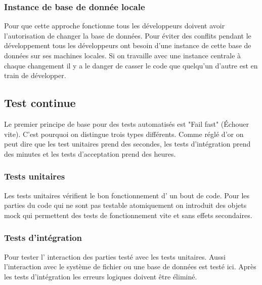 

\subsubsection{Instance de base de donnée locale}

Pour que cette approche fonctionne tous les développeurs doivent avoir l'autorisation de changer la base de données. Pour éviter des conflits pendant le développement tous les développeurs ont besoin d'une instance de cette base de données sur ses machines locales. Si on travaille avec une instance centrale à chaque changement il y a le danger de casser le code que quelqu'un d'autre est en train de développer.
\newpage


\subsection{Test continue}
Le premier principe de base pour des tests automatisés est "Fail fast" (Échouer vite).
C'est pourquoi on distingue trois types différents. Comme réglé d'or on  peut dire que les test unitaires prend des secondes, les tests d'intégration prend des minutes et les tests d'acceptation prend des heures.\nocite{artofunittesting}
\subsubsection{Tests unitaires}
Les tests unitaires vérifient le bon fonctionnement d' un bout de code. Pour les parties du code qui ne sont pas testable atomiquement on introduit des objets mock qui permettent des tests de fonctionnement vite et sans effets secondaires. 
\subsubsection{Tests d'intégration}
Pour tester l' interaction des parties testé avec les tests unitaires. Aussi l'interaction avec le système de fichier ou une base de données est testé ici. Après les tests d'intégration les erreurs logiques doivent être éliminé.
